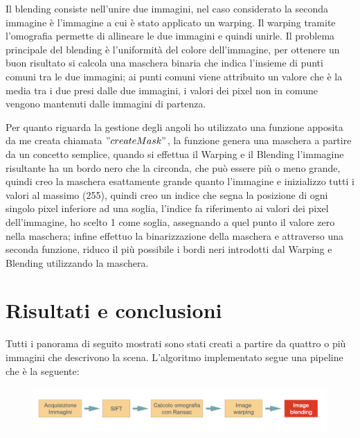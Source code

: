 \documentclass[11pt, oneside]{article}   	%
\begin{document}
Il blending consiste nell'unire due immagini, nel caso considerato la seconda immagine è l'immagine a cui è stato applicato un warping. Il warping tramite l'omografia permette di allineare le due immagini e quindi unirle.
Il problema principale del blending è l'uniformità del colore dell'immagine, per ottenere un buon risultato si calcola una maschera binaria che indica l'insieme di punti comuni tra le due immagini; ai punti comuni viene attribuito un valore che è la media tra i due presi dalle due immagini, i valori dei pixel non in comune vengono mantenuti dalle immagini di partenza.

Per quanto riguarda la gestione degli angoli ho utilizzato una funzione apposita da me creata chiamata  $"createMask"$, la funzione genera una maschera a partire da un concetto semplice, quando si effettua il Warping e il Blending l'immagine risultante ha un bordo nero che la circonda, che può essere più o meno grande, quindi creo la maschera esattamente grande quanto l'immagine e inizializzo tutti i valori al massimo (255), quindi creo un indice che segna la posizione di ogni singolo pixel inferiore ad una soglia, l'indice fa riferimento ai valori dei pixel dell'immagine, ho scelto 1 come soglia, assegnando a quel punto il valore zero nella maschera; infine effettuo la binarizzazione della maschera e attraverso una seconda funzione, riduco il più possibile i bordi neri introdotti dal Warping e Blending utilizzando la maschera.



\section{Risultati e conclusioni}

Tutti i panorama di seguito mostrati sono stati creati a partire da quattro o più immagini che descrivono la scena.
L'algoritmo implementato segue una pipeline che è la seguente:
\begin{figure}[H]
\includegraphics[width=\textwidth]{pipeline}
\end{figure}
\end{document}
